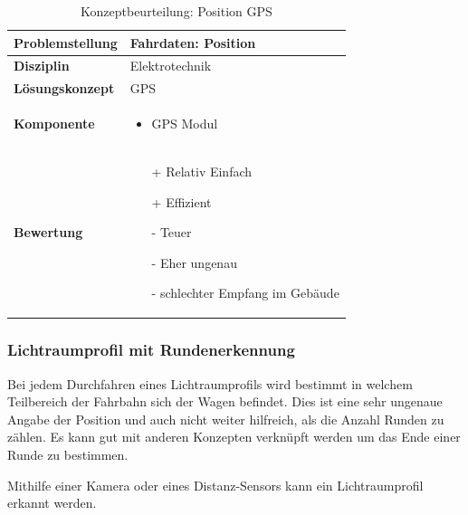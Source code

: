 \documentclass[../../main.tex]{subfiles}
\begin{document}
    \begin{flushleft}
        \begin{table}[H]
        \begin{tabular}{ | l | p{11cm} |}
        \hline
        \textbf{Problemstellung} & Fahrdaten: Position \\ \hline
        \textbf{Disziplin} & Elektrotechnik \\ \hline
        \textbf{Lösungskonzept} & GPS\\ \hline
        \textbf{Komponente} & \begin{itemize}
            \item GPS Modul
            \end{itemize}\\ \hline
        \textbf{Bewertung} &  \begin{itemize}
                                \item[+] Relativ Einfach
                                \item[+] Effizient
                                \item[-] Teuer
                                \item[-] Eher ungenau
                                \item[-] schlechter Empfang im Gebäude 
                              \end{itemize} \\ \hline
        \end{tabular}
        \caption{Konzeptbeurteilung: Position GPS}
        \label{tab:fahr_pos_gps}
    \end{table}
    \end{flushleft}

    \subsubsection{Lichtraumprofil mit Rundenerkennung}
    Bei jedem Durchfahren eines Lichtraumprofils wird bestimmt in welchem Teilbereich der Fahrbahn sich der Wagen befindet.
    Dies ist eine sehr ungenaue Angabe der Position und auch nicht weiter hilfreich, als die Anzahl Runden zu zählen.
    Es kann gut mit anderen Konzepten verknüpft werden um das Ende einer Runde zu bestimmen.

    Mithilfe einer Kamera oder eines Distanz-Sensors kann ein Lichtraumprofil erkannt werden.
\end{document}
